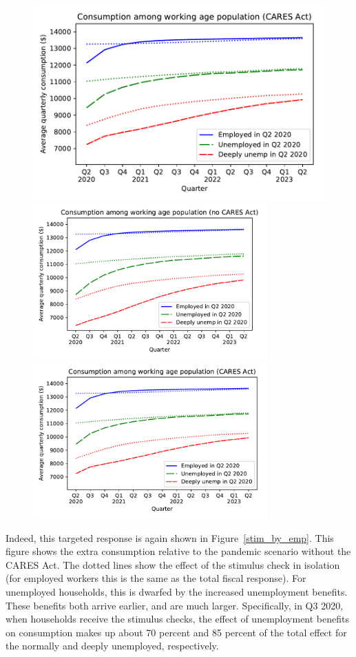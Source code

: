 \begin{figure}
{		\includegraphics[width=0.8\webWidth\textwidth]{./Figures/ConRespByEmpStateWStim}
	} %
	{ \includegraphics[width=0.8\textwidth]{./Figures/ConRespByEmpStateNoStim}
		\includegraphics[width=0.8\textwidth]{./Figures/ConRespByEmpStateWStim}}
\end{figure}

Indeed, this targeted response is again shown in Figure~\ref{stim_by_emp}.
This figure shows the extra consumption relative to the pandemic scenario without the CARES Act.
The dotted lines show the effect of the stimulus check in isolation (for employed workers this is the same as the total fiscal response).
For unemployed households, this is dwarfed by the increased unemployment benefits.
These benefits both arrive earlier, and are much larger.
Specifically, in Q3 2020, when households receive the stimulus checks, the effect of unemployment benefits on consumption makes up about 70 percent and 85 percent of the total effect for the normally and deeply unemployed, respectively.


